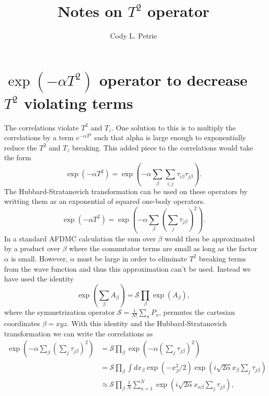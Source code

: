 \documentclass[12pt]{article}
\title{Notes on $T^2$ operator}
\author{Cody L. Petrie}
\begin{document}
\maketitle

\section{$\exp(-\alpha T^2)$ operator to decrease $T^2$ violating terms}
The correlations violate $T^2$ and $T_z$. One solution to this is to multiply the correlations by a term $e^{-\alpha T^2}$ such that alpha is large enough to exponentially reduce the $T^2$ and $T_z$ breaking. This added piece to the correlations would take the form
\begin{equation}
   \exp{\left(-\alpha T^2\right)} = \exp{\left(-\alpha \sum\limits_\beta \sum\limits_{i,j} \tau_{i\beta}\tau_{j\beta}\right)}.
\end{equation}
The Hubbard-Stratanovich transformation can be used on these operators by writting them as an exponential of squared one-body operators.
\begin{equation}
   \exp{\left(-\alpha T^2\right)} = \exp{\left(-\alpha \sum\limits_\beta \left(\sum\limits_{j} \tau_{j\beta}\right)^2\right)}.
\end{equation}
In a standard AFDMC calculation the sum over $\beta$ would then be approximated by a product over $\beta$ where the commutator terms are small as long as the factor $\alpha$ is small. However, $\alpha$ must be large in order to eliminate $T^2$ breaking terms from the wave function and thus this approximation can't be used. Instead we have used the identity
\begin{equation}
   \exp{\left(\sum\limits_\beta A_\beta\right)} = \mathcal{S}\prod\limits_\beta \exp(A_\beta),
\end{equation}
where the symmetrization operator $\mathcal{S}=\frac{1}{N!}\sum\limits_\pi P_\pi$, permutes the cartesian coordinates $\beta=xyz$. With this identity and the Hubbard-Stratanovich transformation we can write the correlations as
\begin{align}
   \exp{\left(-\alpha \sum\limits_\beta \left(\sum\limits_{j} \tau_{j\beta}\right)^2\right)}  &= \mathcal{S} \prod\limits_\beta \exp{\left(-\alpha \left(\sum\limits_{j} \tau_{j\beta}\right)^2\right)} \\
   &= \mathcal{S} \prod\limits_\beta \int dx_\beta \exp{\left(-x_\beta^2/2\right)}\exp{\left(i\sqrt{2\alpha}x_\beta \sum\limits_{j} \tau_{j\beta}\right)} \\
   &\approx \mathcal{S} \prod\limits_\beta \frac{1}{N}\sum\limits_{n=1}^N \exp{\left(i\sqrt{2\alpha}x_{n\beta} \sum\limits_{j} \tau_{j\beta}\right)},
\end{align}
\end{document}
